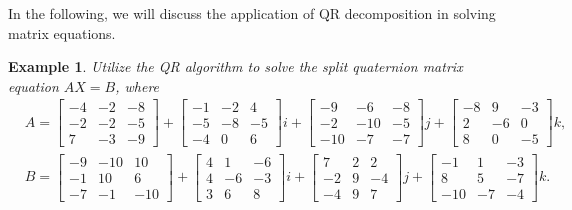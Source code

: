 \documentclass[12pt]{article}
\newtheorem{example}[theorem]{Example}
\numberwithin{equation}{section}
\begin{document}
In the following, we will discuss the application of QR decomposition in solving matrix equations.
\begin{example}
Utilize the QR algorithm to solve the split quaternion matrix equation $AX = B$, where
\begin{align*}
  & A =
    \begin{bmatrix}
    -4 & -2 & -8 \\
    -2 & -2 & -5 \\
     7 & -3 & -9
    \end{bmatrix} +
    \begin{bmatrix}
    -1 & -2 &  4 \\
    -5 & -8 & -5 \\
    -4 &  0 &  6
    \end{bmatrix} i 
    + 
    \begin{bmatrix}
    -9  & -6  & -8 \\
    -2  & -10 & -5 \\
    -10 & -7  & -7
    \end{bmatrix} j +
    \begin{bmatrix}
    -8 &  9 & -3 \\
     2 & -6 &  0 \\
     8 &  0 & -5
    \end{bmatrix} k,\\
  & B =
    \begin{bmatrix}
    -9 & -10 &  10 \\
    -1 &  10 &  6 \\
    -7 & -1  & -10
    \end{bmatrix} +
    \begin{bmatrix}
    4 &  1 & -6 \\
    4 & -6 & -3 \\
    3 &  6 &  8
    \end{bmatrix} i 
    +
    \begin{bmatrix}
     7 & 2 &  2 \\
    -2 & 9 & -4 \\
    -4 & 9 &  7
    \end{bmatrix} j +
    \begin{bmatrix}
    -1 &   1 & -3 \\
     8 &   5 & -7 \\
    -10 & -7 & -4
    \end{bmatrix} k.
\end{align*}
\end{example}  
\end{document}
